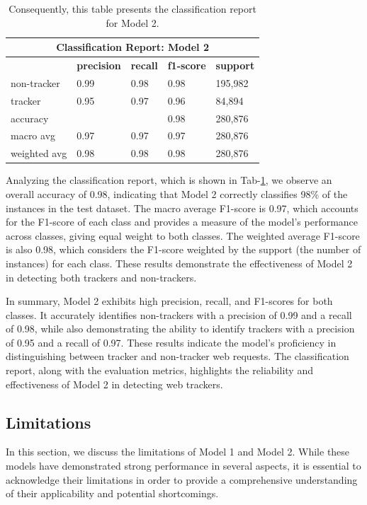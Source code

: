 \begin{table}[ht!]
  \begin{center}
    \begin{tabular}[c]{|l|l|l|l|l|}
      \hline
      \multicolumn{5}{|c|}{\textbf{Classification Report: Model 2}} \\
      \hline
      \textbf{} & \textbf{precision} & \textbf{recall} & \textbf{f1-score} & \textbf{support} \\
      \hline
      non-tracker & 0.99 & 0.98 & 0.98 & 195,982 \\
      \hline
      tracker & 0.95 & 0.97 & 0.96 & 84,894 \\
      \hline
      accuracy & & & 0.98 & 280,876 \\
      \hline
      macro avg & 0.97 & 0.97 & 0.97 & 280,876 \\
      \hline
      weighted avg & 0.98 & 0.98 & 0.98 & 280,876 \\
      
      \hline
    \end{tabular}
  \end{center}

  \caption{Consequently, this table presents the classification report for Model 2.}
  \label{tab:m2}
\end{table}
Analyzing the classification report, which is shown in Tab-\ref{tab:m2}, we observe an overall accuracy of 0.98, indicating that Model 2 correctly
classifies 98\% of the instances in the test dataset. The macro average F1-score is 0.97, which accounts for the F1-score
of each class and provides a measure of the model's performance across classes, giving equal weight to both classes. The
weighted average F1-score is also 0.98, which considers the F1-score weighted by the support (the number of instances) for
each class. These results demonstrate the effectiveness of Model 2 in detecting both trackers and non-trackers.

In summary, Model 2 exhibits high precision, recall, and F1-scores for both classes. It accurately identifies non-trackers
with a precision of 0.99 and a recall of 0.98, while also demonstrating the ability to identify trackers with a precision
of 0.95 and a recall of 0.97. These results indicate the model's proficiency in distinguishing between tracker and non-tracker
web requests. The classification report, along with the evaluation metrics, highlights the reliability and effectiveness of Model 2
in detecting web trackers.

\subsection{Limitations}
In this section, we discuss the limitations of Model 1 and Model 2. While these models have demonstrated strong performance in several aspects, it is essential
to acknowledge their limitations in order to provide a comprehensive understanding of their applicability and potential shortcomings.


